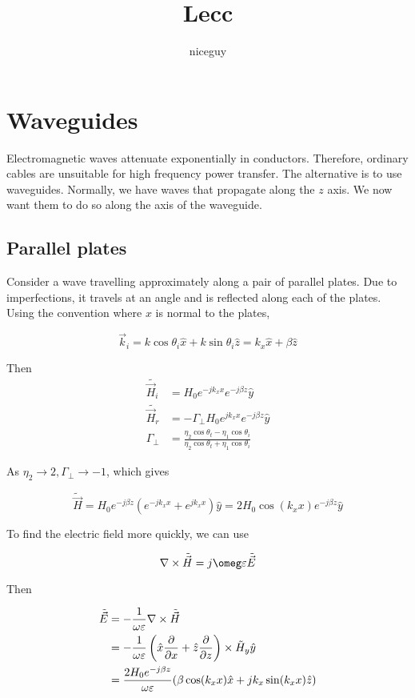 \documentclass[12pt]{article}
\title{Lecc}
\author{niceguy}
\begin{document}
\maketitle

\section{Waveguides}

Electromagnetic waves attenuate exponentially in conductors. Therefore, ordinary cables are unsuitable for high frequency power transfer. The alternative is to use waveguides. Normally, we have waves that propagate along the $z$ axis. We now want them to do so along the axis of the waveguide.

\subsection{Parallel plates}

Consider a wave travelling approximately along a pair of parallel plates. Due to imperfections, it travels at an angle and is reflected along each of the plates. Using the convention where $x$ is normal to the plates,

$$\vec k_i = k\cos\theta_i\hat x + k\sin\theta_i\hat z = k_x\hat x + \beta\hat z$$

Then
\begin{align*}
    \tilde{\vec H_i} &= H_0e^{-jk_xx}e^{-j\beta z}\hat y \\
    \tilde{\vec H_r} &= -\Gamma_\perp H_0e^{jk_xx}e^{-j\beta z}\hat y \\
    \Gamma_\perp &= \frac{\eta_2\cos\theta_t - \eta_1\cos\theta_i}{\eta_2\cos\theta_t + \eta_1\cos\theta_i}
\end{align*}

As $\eta_2 \rightarrow 2, \Gamma_\perp \rightarrow -1$, which gives

$$\tilde{\vec H} = H_0e^{-j\beta z}\left(e^{-jk_xx} + e^{jk_xx}\right)\hat y = 2H_0\cos(k_xx)e^{-j\beta z}\hat y$$

To find the electric field more quickly, we can use

$$\nabla \times \tilde{\vec H} = j\omeg\varepsilon \tilde{\vec E}$$

Then

\begin{align*}
    \tilde{\vec E} &= -\frac{1}{\omega\varepsilon} \nabla \times \tilde{\vec H} \\
                   &= -\frac{1}{\omega\varepsilon} \left(\hat x\frac{\partial }{\partial x} + \hat z\frac{\partial }{\partial z}\right) \times \tilde H_y \hat y \\
                   &= \frac{2H_0e^{-j\beta z}}{\omega\varepsilon}(\beta\cos(k_xx)\hat x + jk_x\sin(k_xx)\hat z)
\end{align*}
\end{document}
